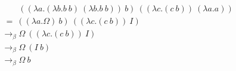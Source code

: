 \documentclass{article}
\begin{document}
\[
\begin{aligned}
& \quad\quad ((\lambda a.(\lambda b.b~b)~(\lambda b.b~b))~b)~((\lambda c.(c~b))~(\lambda a.a)) \\
& ~ = ~      ((\lambda a.\Omega)~                         b)~((\lambda c.(c~b))~I)             \\
& \to_\beta  \Omega~                                         ((\lambda c.(c~b))~I)             \\
& \to_\beta  \Omega~                                                     (I~b)                 \\
& \to_\beta  \Omega~                                                        b                  \\
\end{aligned}
\]
\end{document}
